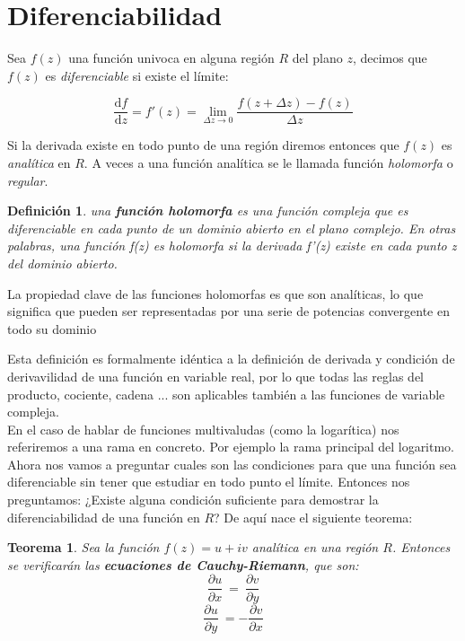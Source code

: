 \documentclass[12pt]{book}
\newcommand{\parciales}[2]{\frac{\partial #1}{\partial #2}}
\newcommand{\D}{\mathrm{d}}
\newcommand{\derivadas}[2]{\frac{\D #1}{\D #2}}
\newtheorem{theorem}{Teorema}[section]
\newtheorem{definicion}{Definición}[section]
\begin{document}
\section{Diferenciabilidad}

Sea $f(z)$ una función univoca en alguna región $R$ del plano $z$, decimos que $f(z)$ es \textit{diferenciable} si existe el límite:

\begin{equation}
\derivadas{f}{z} = f'(z) = \lim_{\Delta z \rightarrow 0} \frac{f(z+\Delta z)-f(z)}{\Delta z}
\end{equation}

Si la derivada existe en todo punto de una región diremos entonces que $f(z)$ es \textit{analítica} en $R$. A veces a una función analítica se le llamada función \textit{holomorfa} o \textit{regular}. \\


\begin{definicion}
una \textbf{función holomorfa} es una función compleja que es diferenciable en cada punto de un dominio abierto en el plano complejo. En otras palabras, una función f(z) es holomorfa si la derivada f'(z) existe en cada punto z del dominio abierto. 
\end{definicion}

La propiedad clave de las funciones holomorfas es que son analíticas, lo que significa que pueden ser representadas por una serie de potencias convergente en todo su dominio


Esta definición es formalmente idéntica a la definición de derivada y condición de derivavilidad de una función en variable real, por lo que todas las reglas del producto, cociente, cadena ... son aplicables también a las funciones de variable compleja. \\

En el caso de hablar de funciones multivaludas (como la logarítica) nos referiremos a una rama en concreto. Por ejemplo la rama principal del logaritmo. \\


Ahora nos vamos a preguntar cuales son las condiciones para que una función sea diferenciable sin tener que estudiar en todo punto el límite. Entonces nos preguntamos: ¿Existe alguna condición suficiente para demostrar la diferenciabilidad de una función en $R$? De aquí nace el siguiente teorema: \\

\begin{theorem}
Sea la función $f(z)=u+iv$ analítica en una región $R$. Entonces se verificarán las \textbf{ecuaciones de Cauchy-Riemann}, que son:
$$ \parciales{u}{x} \ = \ \parciales{v}{y}  $$
$$ \parciales{u}{y} \ = - \parciales{v}{x} $$
\end{theorem}
\end{document}
